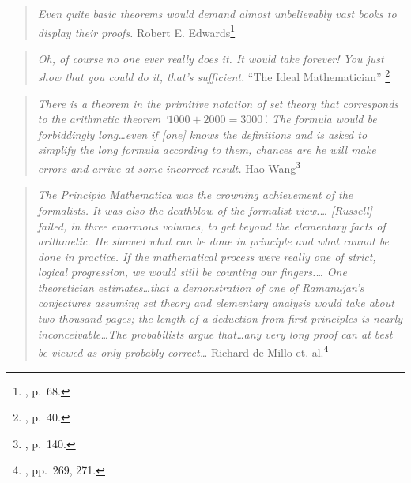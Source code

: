 \begin{quote}
  {\em Even quite basic theorems would demand almost unbelievably vast
  books to display their proofs.}
    \flushright\sc  Robert E. Edwards\footnote{\cite{Edwards}, p.~68.}\\
\end{quote}

\begin{quote}
  {\em Oh, of course no one ever really {\em does} it.  It would take
  forever!  You just show that you could do it, that's sufficient.}
    \flushright\sc  ``The Ideal Mathematician''
    \footnote{\cite{Davis},
p.~40.}\\
\end{quote}

\begin{quote}
  {\em There is a theorem in the primitive notation of set theory that
  corresponds to the arithmetic theorem `$1000+2000=3000$'.  The formula
  would be forbiddingly long\ldots even if [one] knows the definitions
  and is asked to simplify the long formula according to them, chances are
  he will make errors and arrive at some incorrect result.}
    \flushright\sc  Hao Wang\footnote{\cite{Wang}, p.~140.}\\
\end{quote}

\vspace{-0.5em}

\begin{quote}
  {\em The {\em Principia Mathematica} was the crowning achievement of the
  formalists.  It was also the deathblow of the formalist view.\ldots
  {[Rus\-sell]} failed, in three enormous volumes, to get beyond the elementary
  facts of arithmetic.  He showed what can be done in principle and what
  cannot be done in practice.  If the mathematical process were really
  one of strict, logical progression, we would still be counting our
  fingers.\ldots
  One theoretician estimates\ldots that a demonstration of one of
  Ramanujan's conjectures assuming set theory and elementary analysis would
  take about two thousand pages; the length of a deduction from first principles
  is nearly in\-con\-ceiv\-a\-ble\ldots The probabilists argue that\ldots any
  very long proof can at best be viewed as only probably correct\ldots}
  \flushright\sc Richard de Millo et. al.\footnote{\cite{deMillo}, pp.~269,
  271.}\\
\end{quote}

